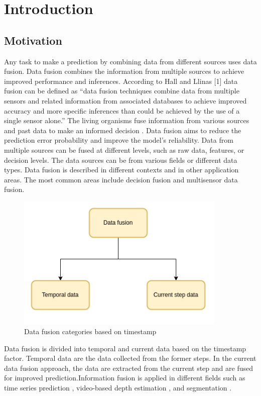 
    \chapter{Introduction}
	
	\section{Motivation}
		
	Any task to make a prediction by combining data from different sources uses data fusion. Data fusion combines the information from multiple sources to achieve improved performance and inferences. According to Hall and Llinas [1] data fusion can be defined as “data fusion techniques combine data from multiple sensors and related information from associated databases to achieve improved accuracy and more specific inferences than could be achieved by the use of a single sensor alone.” The living organisms fuse information from various sources and past data to make an informed decision \cite{01_mandic2005data}. 
	Data fusion aims to reduce the prediction error probability and improve the model's reliability. Data from multiple sources can be fused at different levels, such as raw data, features, or decision levels. The data sources can be from various fields or different data types. Data fusion is described in different contexts and in other application areas. The most common areas include decision fusion and multisensor data fusion. \cite{06_castanedo2013review}
	
	\begin{figure}[h]
		\centering
		\includegraphics[width=10cm]{images/df.png}
		\caption{Data fusion categories based on timestamp}
		\label{fig:3D_reconstruction}
	\end{figure}

	Data fusion is divided into temporal and current data based on the timestamp factor. Temporal data are the data collected from the former steps. In the current data fusion approach, the data are extracted from the current step and are fused for improved prediction.Information fusion is applied in different fields such as time series prediction \cite{02_lim2021temporal}, video-based depth estimation \cite{03_duzceker2021deepvideomvs}, and segmentation \cite{04_li2021spatial}.
	
